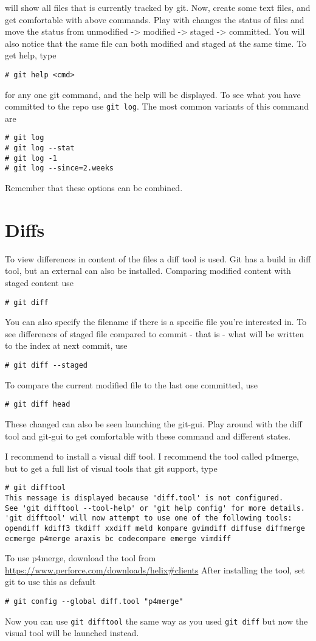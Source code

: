 \documentclass[10pt,a4paper]{article}
\begin{document}
will show all files that is currently tracked by git. Now, create some text files, and get comfortable with above commands. Play with changes the status of files and move the status from unmodified -> modified -> staged -> committed. You will also notice that the same file can both modified and staged at the same time. To get help, type \begin{lstlisting}
# git help <cmd>
\end{lstlisting}
for any one git command, and the help will be displayed. To see what you have committed to the repo use \texttt{git log}. The most common variants of this command are
\begin{lstlisting}
# git log
# git log --stat
# git log -1
# git log --since=2.weeks
\end{lstlisting}
Remember that these options can be combined.

\section{Diffs}
To view differences in content of the files a diff tool is used. Git has a build in diff tool, but an external can also be installed. Comparing modified content with staged content use
\begin{lstlisting}
# git diff
\end{lstlisting}
You can also specify the filename if there is a specific file you're interested in. To see differences of staged file compared to commit - that is - what will be written to the index at next commit, use
\begin{lstlisting}
# git diff --staged
\end{lstlisting}
To compare the current modified file to the last one committed, use 
\begin{lstlisting}
# git diff head
\end{lstlisting}

These changed can also be seen launching the git-gui. Play around with the diff tool and git-gui to get comfortable with these command and different states.

I recommend to install a visual diff tool. I recommend the tool called p4merge, but to get a full list of visual tools that git support, type 
\begin{lstlisting}
# git difftool
This message is displayed because 'diff.tool' is not configured.
See 'git difftool --tool-help' or 'git help config' for more details.
'git difftool' will now attempt to use one of the following tools:
opendiff kdiff3 tkdiff xxdiff meld kompare gvimdiff diffuse diffmerge ecmerge p4merge araxis bc codecompare emerge vimdiff
\end{lstlisting}
To use p4merge, download the tool from\\
\url{https://www.perforce.com/downloads/helix#clients}
After installing the tool, set git to use this as default
\begin{lstlisting}
# git config --global diff.tool "p4merge"
\end{lstlisting}
Now you can use \texttt{git difftool} the same way as you used \texttt{git diff} but now the visual tool will be launched instead.
\end{document}
